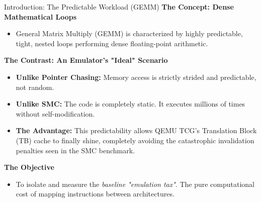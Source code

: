 \documentclass[aspectratio=169]{beamer} %
\begin{document}
  \begin{frame}{Introduction: The Predictable Workload (GEMM)}
      \textbf{The Concept: Dense Mathematical Loops}
      \begin{itemize}
          \item General Matrix Multiply (GEMM) is characterized by highly predictable, tight, nested loops performing dense floating-point arithmetic.
      \end{itemize}
      
      \vspace{0.4cm}
      \textbf{The Contrast: An Emulator's "Ideal" Scenario}
      \begin{itemize}
          \item \textbf{Unlike Pointer Chasing:} Memory access is strictly strided and predictable, not random.
          \item \textbf{Unlike SMC:} The code is completely static. It executes millions of times without self-modification.
          \item \textbf{The Advantage:} This predictability allows QEMU TCG's Translation Block (TB) cache to finally shine, completely avoiding the catastrophic invalidation penalties seen in the SMC benchmark.
      \end{itemize}

      \vspace{0.4cm}
      \textbf{The Objective}
      \begin{itemize}
          \item To isolate and measure the \textit{baseline "emulation tax"}. The pure computational cost of mapping instructions between architectures.
      \end{itemize}
  \end{frame}
\end{document}
